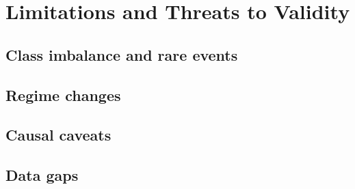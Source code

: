 \section{Limitations and Threats to Validity}\label{sec:limitations}

\subsection{Class imbalance and rare events}\label{sec:lim-imbalance}

\subsection{Regime changes}\label{sec:lim-regimes}

\subsection{Causal caveats}\label{sec:lim-causal}

\subsection{Data gaps}\label{sec:lim-data}
